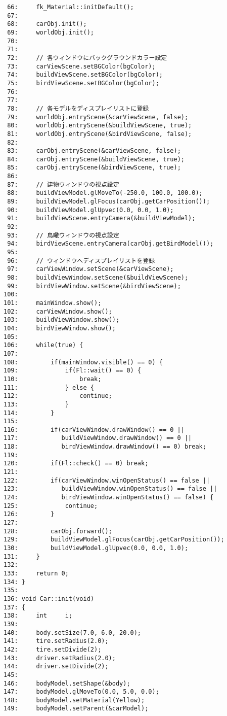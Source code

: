 \begin{breakbox}
\begin{verbatim}
 66:     fk_Material::initDefault();
 67: 
 68:     carObj.init();
 69:     worldObj.init();
 70: 
 71: 
 72:     // 各ウィンドウにバックグラウンドカラー設定
 73:     carViewScene.setBGColor(bgColor);
 74:     buildViewScene.setBGColor(bgColor);
 75:     birdViewScene.setBGColor(bgColor);
 76: 
 77: 
 78:     // 各モデルをディスプレイリストに登録
 79:     worldObj.entryScene(&carViewScene, false);
 80:     worldObj.entryScene(&buildViewScene, true);
 81:     worldObj.entryScene(&birdViewScene, false);
 82: 
 83:     carObj.entryScene(&carViewScene, false);
 84:     carObj.entryScene(&buildViewScene, true);
 85:     carObj.entryScene(&birdViewScene, true);
 86: 
 87:     // 建物ウィンドウの視点設定
 88:     buildViewModel.glMoveTo(-250.0, 100.0, 100.0);
 89:     buildViewModel.glFocus(carObj.getCarPosition());
 90:     buildViewModel.glUpvec(0.0, 0.0, 1.0);
 91:     buildViewScene.entryCamera(&buildViewModel);
 92: 
 93:     // 鳥瞰ウィンドウの視点設定
 94:     birdViewScene.entryCamera(carObj.getBirdModel());
 95: 
 96:     // ウィンドウへディスプレイリストを登録
 97:     carViewWindow.setScene(&carViewScene);
 98:     buildViewWindow.setScene(&buildViewScene);
 99:     birdViewWindow.setScene(&birdViewScene);
100: 
101:     mainWindow.show();
102:     carViewWindow.show();
103:     buildViewWindow.show();
104:     birdViewWindow.show();
105: 
106:     while(true) {
107: 
108:         if(mainWindow.visible() == 0) {
109:             if(Fl::wait() == 0) {
110:                 break;
111:             } else {
112:                 continue;
113:             }
114:         }
115: 
116:         if(carViewWindow.drawWindow() == 0 ||
117:            buildViewWindow.drawWindow() == 0 ||
118:            birdViewWindow.drawWindow() == 0) break;
119: 
120:         if(Fl::check() == 0) break;
121: 
122:         if(carViewWindow.winOpenStatus() == false ||
123:            buildViewWindow.winOpenStatus() == false ||
124:            birdViewWindow.winOpenStatus() == false) {
125:             continue;
126:         }     
127: 
128:         carObj.forward();
129:         buildViewModel.glFocus(carObj.getCarPosition());
130:         buildViewModel.glUpvec(0.0, 0.0, 1.0);
131:     }
132:     
133:     return 0;
134: }
135: 
136: void Car::init(void)
137: {
138:     int     i;
139: 
140:     body.setSize(7.0, 6.0, 20.0);
141:     tire.setRadius(2.0);
142:     tire.setDivide(2);
143:     driver.setRadius(2.0);
144:     driver.setDivide(2);
145: 
146:     bodyModel.setShape(&body);
147:     bodyModel.glMoveTo(0.0, 5.0, 0.0);
148:     bodyModel.setMaterial(Yellow);
149:     bodyModel.setParent(&carModel);

\end{verbatim}
\end{breakbox}
